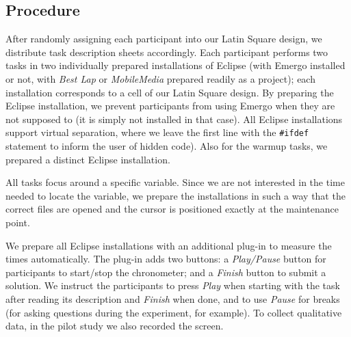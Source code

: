 \subsection{Procedure}

After randomly assigning each participant into our Latin Square design, we distribute task description sheets accordingly. Each participant performs two tasks in two individually prepared installations of Eclipse (with Emergo installed or not, with \textit{Best Lap} or \textit{MobileMedia} prepared readily as a project); each installation corresponds to a cell of our Latin Square design. By preparing the Eclipse installation, we prevent participants from using Emergo when they are not supposed to (it is simply not installed in that case). All Eclipse installations support virtual separation, where we leave the first line with the \texttt{\#ifdef} statement to inform the user of hidden code). Also for the warmup tasks, we prepared a distinct Eclipse installation.


All tasks focus around a specific variable. Since we are not interested in the time needed to locate the variable, we prepare the installations in such a way that the correct files are opened and the cursor is positioned exactly at the maintenance point.



We prepare all Eclipse installations with an additional plug-in to measure the times automatically. The plug-in adds two buttons: a \textit{Play/Pause} button for participants to start/stop the chronometer; and a \textit{Finish} button to submit a solution. We instruct the participants to press \textit{Play} when starting with the task after reading its description and \emph{Finish} when done, and to use \emph{Pause} for breaks (for asking questions during the experiment, for example). To collect qualitative data, in the pilot study we also recorded the screen.

